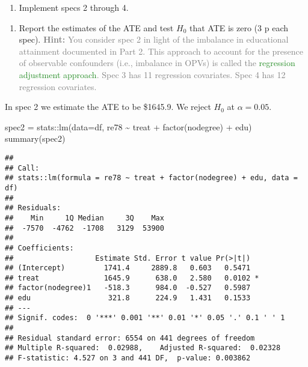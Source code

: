 \documentclass[
]{article}
\newenvironment{Shaded}{\begin{snugshade}}{\end{snugshade}}
\newcommand{\AttributeTok}[1]{\textcolor[rgb]{0.77,0.63,0.00}{#1}}
\newcommand{\FunctionTok}[1]{\textcolor[rgb]{0.00,0.00,0.00}{#1}}
\newcommand{\NormalTok}[1]{#1}
\newcommand{\OtherTok}[1]{\textcolor[rgb]{0.56,0.35,0.01}{#1}}
\newcommand{\SpecialCharTok}[1]{\textcolor[rgb]{0.00,0.00,0.00}{#1}}
\providecommand{\tightlist}{%
  \setlength{\itemsep}{0pt}\setlength{\parskip}{0pt}}
\begin{document}
\begin{enumerate}
\def\labelenumi{\arabic{enumi}.}
\setcounter{enumi}{1}
\tightlist
\item
  Implement specs 2 through 4.
\end{enumerate}

\begin{enumerate}
\def\labelenumi{\alph{enumi}.}
\tightlist
\item
  Report the estimates of the ATE and test \(H_0\) that ATE is zero (3 p
  each spec).
  \textcolor{gray}{\textbf{Hint:} You consider spec 2 in light of the imbalance in educational attainment documented in Part 2. This approach to account for the presence of observable confounders (i.e., imbalance in OPVs) is called the \textcolor{ForestGreen}{regression adjustment approach}. Spec 3 has 11 regression covariates. Spec 4 has 12 regression covariates.}
\end{enumerate}

In spec 2 we estimate the ATE to be \$1645.9. We reject \(H_0\) at
\(\alpha = 0.05\).

\begin{Shaded}
\begin{Highlighting}[]
\NormalTok{spec2 }\OtherTok{=}\NormalTok{ stats}\SpecialCharTok{::}\FunctionTok{lm}\NormalTok{(}\AttributeTok{data=}\NormalTok{df, re78 }\SpecialCharTok{\textasciitilde{}}\NormalTok{ treat }\SpecialCharTok{+} \FunctionTok{factor}\NormalTok{(nodegree) }\SpecialCharTok{+}\NormalTok{ edu)}
\FunctionTok{summary}\NormalTok{(spec2)}
\end{Highlighting}
\end{Shaded}

\begin{verbatim}
## 
## Call:
## stats::lm(formula = re78 ~ treat + factor(nodegree) + edu, data = df)
## 
## Residuals:
##    Min     1Q Median     3Q    Max 
##  -7570  -4762  -1708   3129  53900 
## 
## Coefficients:
##                   Estimate Std. Error t value Pr(>|t|)  
## (Intercept)         1741.4     2889.8   0.603   0.5471  
## treat               1645.9      638.0   2.580   0.0102 *
## factor(nodegree)1   -518.3      984.0  -0.527   0.5987  
## edu                  321.8      224.9   1.431   0.1533  
## ---
## Signif. codes:  0 '***' 0.001 '**' 0.01 '*' 0.05 '.' 0.1 ' ' 1
## 
## Residual standard error: 6554 on 441 degrees of freedom
## Multiple R-squared:  0.02988,    Adjusted R-squared:  0.02328 
## F-statistic: 4.527 on 3 and 441 DF,  p-value: 0.003862
\end{verbatim}
\end{document}
